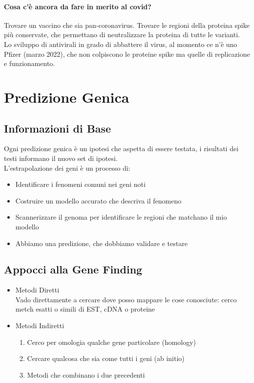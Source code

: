 \documentclass{article}
\begin{document}
\paragraph{Cosa c'è ancora da fare in merito al covid?}
Trovare un vaccino che sia pan-coronavirus. Trovare le regioni della proteina spike più conservate, che permettano di neutralizzare la proteina di tutte le varianti.\\
Lo sviluppo di antivirali in grado di abbattere il virus, al momento ce n'è uno Pfizer (marzo 2022), che non colpiscono le proteine spike ma quelle di replicazione e funzionamento.

\section{Predizione Genica}
\subsection{Informazioni di Base}
Ogni predizione genica è un ipotesi che aspetta di essere testata, i risultati dei testi informano il nuovo set di ipotesi.\\
L'estrapolazione dei geni è un processo di:
\begin{itemize}
    \item Identificare i fenomeni comuni nei geni noti 
    \item Costruire un modello accurato che descriva il fenomeno 
    \item Scannerizzare il genoma per identificare le regioni che matchano il mio modello 
    \item Abbiamo una predizione, che dobbiamo validare e testare
\end{itemize}
\subsection{Appocci alla Gene Finding}
\begin{itemize}
    \item Metodi Diretti \\ Vado direttamente a cercare dove posso mappare le cose conosciute: cerco metch esatti o simili di EST, cDNA o proteine
    \item Metodi Indiretti
        \begin{enumerate}
            \item Cerco per omologia qualche gene particolare (homology)
            \item Cercare qualcosa che sia come tutti i geni (ab initio)
            \item Metodi che combinano i due precedenti
        \end{enumerate}
\end{itemize}
\end{document}

